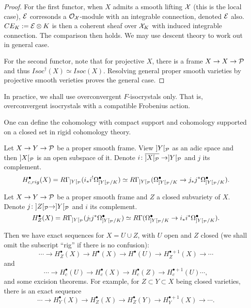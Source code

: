 \begin{proof}
    For the first functor, when $X$ admits a smooth lifting ${\mathcal {X}}$ (this is the local case), 
    ${\mathcal {E}}$ corresonds a ${\mathcal {O}}_{{\mathcal {X}}}$-module with an integrable connection, denoted ${\mathcal {E}}$ also. 
    $CE_K := {\mathcal {E}} \otimes K$ is then a coherent sheaf 
    over ${\mathcal {X}}_K$ with induced integrable connection. 
    The comparison then holds. 
    We may use descent theory to work out in general case.

    For the second functor, note that for projective $X$, 
    there is a frame $X \to X \to {\mathcal {P}}$ and thus $Isoc^\dagger(X) \simeq Isoc(X)$. 
    Resolving general proper smooth varieties 
    by projective smooth verieties proves the general case. 
\end{proof}

\begin{remark}
    In practice, we shall use overconvergent $F$-isocrystals only. 
    That is, overconvergent isocrystals with a compatible Frobenius action.
\end{remark}

One can define the cohomology with compact support and cohomology 
supported on a closed set in rigid cohomology theory.
\begin{definition}
    Let $X \to Y \to {\mathcal {P}}$ be a proper smooth frame. 
    View $]Y[_{\mathcal {P}}$ as an adic space and then $]X[_{\mathcal {P}}$ is an open subspace of it. 
    Denote $i\colon \overline{]X[_{\mathcal {P}}} \to ]Y[_{\mathcal {P}}$ and $j$ its complement.
    \[
        H^\bullet_{c,rig}(X) = R\Gamma_{]Y[_{\mathcal {P}}} (i_*i^! \Omega_{]Y[_{\mathcal {P}}/K}^\bullet) 
        \simeq R\Gamma_{]Y[_{\mathcal {P}}} (\Omega_{]Y[_{\mathcal {P}}/K}^\bullet \to j_*j^*\Omega_{]Y[_{\mathcal {P}}/K}^\bullet).
    \]
\end{definition}

\begin{definition}
    Let $X \to Y \to {\mathcal {P}}$ be a proper smooth frame and $Z$ a closed subvariety of $X$. 
    Denote $j \colon ]Z[_{\mathcal {P}} \to ]Y[_{\mathcal {P}}$ and $i$ its complement.
    \[
        H^\bullet_Z(X) = R\Gamma_{]Y[_{\mathcal {P}}} (j_! j^* \Omega_{]Y[_{\mathcal {P}}/K}^\bullet) 
        \simeq R\Gamma(\Omega_{]Y[_{\mathcal {P}}/K}^\bullet \to i_*i^* \Omega_{]Y[_{\mathcal {P}}/K}^\bullet).
    \]
\end{definition}

Then we have exact sequences for $X=U\cup Z$, 
with $U$ open and $Z$ closed 
(we shall omit the subscript ``rig'' if there is no confusion):
\[
    \cdots \to H^\bullet_Z(X) \to H^\bullet(X) \to H^\bullet(U) \to H^{\bullet+1}_Z(X) \to \cdots
\]
and 
\[
    \cdots \to H^\bullet_c(U) \to H^\bullet_c(X) \to H^\bullet_c(Z) \to H^{\bullet+1}_c(U) \cdots,
\]
and some excision theorems. 
For example, for $Z \subset Y \subset X$ being closed varieties, 
there is an exact sequence
\[
    \cdots \to H^\bullet_Y(X) \to H^\bullet_Z(X) \to H^\bullet_Z(Y) \to H^{\bullet+1}_Y(X) \to \cdots.
\]

